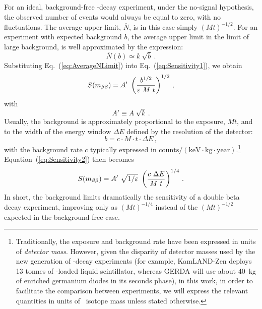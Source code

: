 \documentclass{PoS}
\begin{document}
For an ideal, background-free \bbonu-decay experiment, under the no-signal hypothesis, the observed number of events would always be equal to zero, with no fluctuations. The average upper limit, $\overline{N}$, is in this case simply $(Mt)^{-1/2}$. For an experiment with expected background $b$, the average upper limit in the limit of large background, is well approximated  by the expression:
\begin{equation}
\overline{N}(b) \simeq k~\sqrt{b}\ . \label{eq:AverageNLimit}
\end{equation}
Substituting Eq.~(\ref{eq:AverageNLimit}) into Eq.~(\ref{eq:Sensitivity1}), we obtain
\begin{equation}
S(\mbb) = A'\ \left(\frac{b^{1/2}}{\varepsilon~M~t}\right)^{1/2}\,, \label{eq:Sensitivity2}
\end{equation}
with
\begin{equation}
{A}' \equiv {A}\ \sqrt{k}\,.
\end{equation}
Usually, the background is approximately proportional to the exposure, $Mt$, and to the width of the energy window $\Delta E$ defined by the resolution of the detector:
\begin{equation}
b = c \cdot M \cdot t \cdot \Delta E \,,
\end{equation}
with the background rate $c$ typically expressed in $\mathrm{counts}/(\mathrm{keV}\cdot\mathrm{kg}\cdot\mathrm{year})$.\footnote{Traditionally, the exposure and background rate have been expressed in units of \emph{detector mass}. However, given the disparity of detector masses used by the new generation of \bbonu-decay experiments (for example, KamLAND-Zen deploys 13 tonnes of \XE-loaded liquid scintillator, whereas GERDA will use about 40~kg of enriched germanium diodes in its seconds phase), in this work, in order to facilitate the comparison between experiments, we will express the relevant quantities in units of \bb\ isotope mass unless stated otherwise.} Equation~(\ref{eq:Sensitivity2}) then becomes
\begin{equation}
{S}(\mbb) = {A}'\ \sqrt{1/\varepsilon}\ \left(\frac{c~\Delta E}{M~t}\right)^{1/4}\,. \label{eq:Sensitivity3}
\end{equation}
In short, the background limits dramatically the sensitivity of a double beta decay experiment, improving only as $(Mt)^{-1/4}$ instead of the $(Mt)^{-1/2}$ expected in the background-free case.


\end{document}
